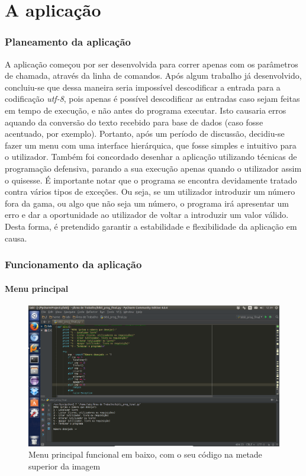 \documentclass[11pt,openany,twoside]{report}
\begin{document}
\chapter{A aplicação}

\subsection{Planeamento da aplicação}

A aplicação começou por ser desenvolvida para correr apenas com os parâmetros de chamada, através da linha de comandos. Após algum trabalho já desenvolvido, concluiu-se que dessa maneira seria impossível descodificar a entrada para a codificação \textit{utf-8}, pois apenas é possível descodificar as entradas caso sejam feitas em tempo de execução, e não antes do programa executar. Isto causaria erros aquando da conversão do texto recebido para base de dados (caso fosse acentuado, por exemplo). Portanto, após um período de discussão, decidiu-se fazer um menu com uma interface hierárquica, que fosse simples e intuitivo para o utilizador. Também foi concordado desenhar a aplicação utilizando técnicas de programação defensiva, parando a sua execução apenas quando o utilizador assim o quisesse. É importante notar que o programa se encontra devidamente tratado contra vários tipos de exceções. Ou seja, se um utilizador introduzir um número fora da gama, ou algo que não seja um número, o programa irá apresentar um erro e dar a oportunidade ao utilizador de voltar a introduzir um valor válido. Desta forma, é pretendido garantir a estabilidade e flexibilidade da aplicação em causa.

\subsection{Funcionamento da aplicação}

\subsubsection{Menu principal}

\begin{figure}
 \center
 \includegraphics[scale=.35]{menu_principal.png}
 \caption{Menu principal funcional em baixo, com o seu código na metade superior da imagem}
 \label{menu_0}
\end{figure}
\end{document}
